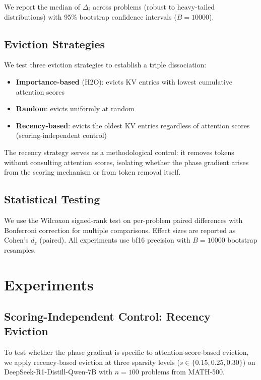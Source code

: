 \documentclass[11pt,a4paper]{article}
\begin{document}
We report the median of $\Delta_i$ across problems (robust to heavy-tailed distributions) with 95\% bootstrap confidence intervals ($B=10000$).

\subsection{Eviction Strategies}

We test three eviction strategies to establish a triple dissociation:
\begin{itemize}
    \item \textbf{Importance-based} (H2O): evicts KV entries with lowest cumulative attention scores
    \item \textbf{Random}: evicts uniformly at random
    \item \textbf{Recency-based}: evicts the oldest KV entries regardless of attention scores (scoring-independent control)
\end{itemize}

The recency strategy serves as a methodological control: it removes tokens without consulting attention scores, isolating whether the phase gradient arises from the scoring mechanism or from token removal itself.

\subsection{Statistical Testing}

We use the Wilcoxon signed-rank test on per-problem paired differences with Bonferroni correction for multiple comparisons. Effect sizes are reported as Cohen's $d_z$ (paired). All experiments use bf16 precision with $B=10000$ bootstrap resamples.

\section{Experiments}

\subsection{Scoring-Independent Control: Recency Eviction}

To test whether the phase gradient is specific to attention-score-based eviction, we apply recency-based eviction at three sparsity levels ($s \in \{0.15, 0.25, 0.30\}$) on DeepSeek-R1-Distill-Qwen-7B with $n=100$ problems from MATH-500.
\end{document}
